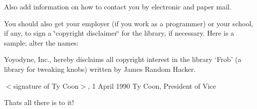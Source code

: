 Also add information on how to contact you by electronic and paper mail.

You should also get your employer (if you work as a programmer) or your school, if any, to sign a \char`\"{}copyright disclaimer\char`\"{} for the library, if necessary. Here is a sample; alter the names\+:

Yoyodyne, Inc., hereby disclaims all copyright interest in the library `Frob' (a library for tweaking knobs) written by James Random Hacker.

$<$signature of Ty Coon$>$, 1 April 1990 Ty Coon, President of Vice

That\textquotesingle{}s all there is to it! 